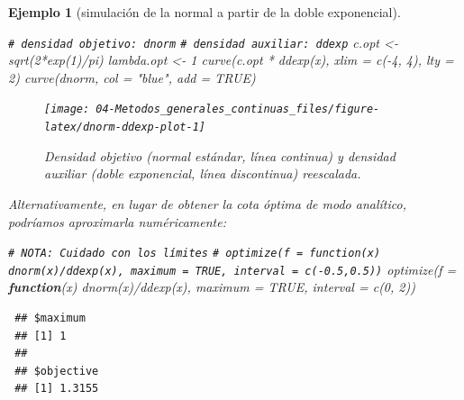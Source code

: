 \documentclass[
  10pt,
]{book}
\newenvironment{Shaded}{\begin{snugshade}}{\end{snugshade}}
\newcommand{\AttributeTok}[1]{\textcolor[rgb]{0.77,0.63,0.00}{#1}}
\newcommand{\CommentTok}[1]{\textcolor[rgb]{0.56,0.35,0.01}{\textit{#1}}}
\newcommand{\ConstantTok}[1]{\textcolor[rgb]{0.00,0.00,0.00}{#1}}
\newcommand{\ControlFlowTok}[1]{\textcolor[rgb]{0.13,0.29,0.53}{\textbf{#1}}}
\newcommand{\DecValTok}[1]{\textcolor[rgb]{0.00,0.00,0.81}{#1}}
\newcommand{\FunctionTok}[1]{\textcolor[rgb]{0.00,0.00,0.00}{#1}}
\newcommand{\NormalTok}[1]{#1}
\newcommand{\OtherTok}[1]{\textcolor[rgb]{0.56,0.35,0.01}{#1}}
\newcommand{\SpecialCharTok}[1]{\textcolor[rgb]{0.00,0.00,0.00}{#1}}
\newcommand{\StringTok}[1]{\textcolor[rgb]{0.31,0.60,0.02}{#1}}
\theoremstyle{break}
\newtheorem{example}{Ejemplo}[chapter]
\theoremstyle{nonumberplain}
\renewcommand{\CommentTok}[1]{\textcolor[rgb]{0.41,0.41,0.41}{\texttt{#1}}}
\begin{document}
\begin{example}[simulación de la normal a partir de la doble exponencial]
\begin{Shaded}
\begin{Highlighting}[]
\CommentTok{\# densidad objetivo: dnorm}
\CommentTok{\# densidad auxiliar: ddexp}
\NormalTok{c.opt }\OtherTok{\textless{}{-}} \FunctionTok{sqrt}\NormalTok{(}\DecValTok{2}\SpecialCharTok{*}\FunctionTok{exp}\NormalTok{(}\DecValTok{1}\NormalTok{)}\SpecialCharTok{/}\NormalTok{pi)}
\NormalTok{lambda.opt }\OtherTok{\textless{}{-}} \DecValTok{1}
\FunctionTok{curve}\NormalTok{(c.opt }\SpecialCharTok{*} \FunctionTok{ddexp}\NormalTok{(x), }\AttributeTok{xlim =} \FunctionTok{c}\NormalTok{(}\SpecialCharTok{{-}}\DecValTok{4}\NormalTok{, }\DecValTok{4}\NormalTok{), }\AttributeTok{lty =} \DecValTok{2}\NormalTok{)}
\FunctionTok{curve}\NormalTok{(dnorm, }\AttributeTok{col =} \StringTok{"blue"}\NormalTok{, }\AttributeTok{add =} \ConstantTok{TRUE}\NormalTok{)}
\end{Highlighting}
\end{Shaded}

\begin{figure}[!htbp]

{\centering \texttt{[image: 04-Metodos\_generales\_continuas\_files/figure-latex/dnorm-ddexp-plot-1]} 

}

\caption{Densidad objetivo (normal estándar, línea continua) y densidad auxiliar (doble exponencial, línea discontinua) reescalada.}\label{fig:dnorm-ddexp-plot}
\end{figure}

Alternativamente, en lugar de obtener la cota óptima de modo analítico, podríamos aproximarla numéricamente:

\begin{Shaded}
\begin{Highlighting}[]
\CommentTok{\# NOTA: Cuidado con los límites}
\CommentTok{\# optimize(f = function(x) dnorm(x)/ddexp(x), maximum = TRUE, interval = c({-}0.5,0.5))}
\FunctionTok{optimize}\NormalTok{(}\AttributeTok{f =} \ControlFlowTok{function}\NormalTok{(x) }\FunctionTok{dnorm}\NormalTok{(x)}\SpecialCharTok{/}\FunctionTok{ddexp}\NormalTok{(x), }\AttributeTok{maximum =} \ConstantTok{TRUE}\NormalTok{, }\AttributeTok{interval =} \FunctionTok{c}\NormalTok{(}\DecValTok{0}\NormalTok{, }\DecValTok{2}\NormalTok{))}
\end{Highlighting}
\end{Shaded}

\begin{verbatim}
 ## $maximum
 ## [1] 1
 ## 
 ## $objective
 ## [1] 1.3155
\end{verbatim}


\end{example}
\end{document}
